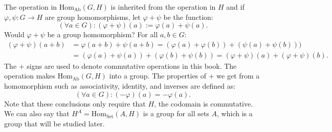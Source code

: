 \documentclass{report}
\begin{document}
The operation in $\text{Hom}_{\text{Ab}}(G, H)$ is inherited from the operation in $H$ and if $\varphi, \psi: G \rightarrow H$ are group homomorphisms, let $\varphi + \psi$ be the function:
    \begin{equation*}
        (\forall a \in G) : (\varphi + \psi)(a) := \varphi(a) + \psi(a).
    \end{equation*}
Would $\varphi + \psi$ be a group homomorphism? For all $a, b \in G$:
    \begin{align*}
        (\varphi + \psi)(a + b) &= \varphi(a + b) + \psi(a + b) = (\varphi(a) + \varphi(b)) + (\psi(a) + \psi(b)))              \\
                                &= (\varphi(a) + \psi(a)) + (\varphi(b) + \psi(b)) = (\varphi + \psi)(a) + (\varphi + \psi)(b).   
    \end{align*}
The $+$ signs are used to denote commutative operations in this book. The operation makes $\text{Hom}_{\text{Ab}}(G, H)$ into a group. The properties of $+$ we get from a homomorphism such as associativity, identity, and inverses are defined as:
    \begin{equation*}
        (\forall a \in G) : (-\varphi)(a) = -\varphi(a).
    \end{equation*}
Note that these conclusions only require that $H$, the codomain is commutative. We can also say that $H^{A} = \text{Hom}_{\text{Set}}(A, H)$ is a group for all sets $A$, which is a group that will be studied later.
\end{document}
